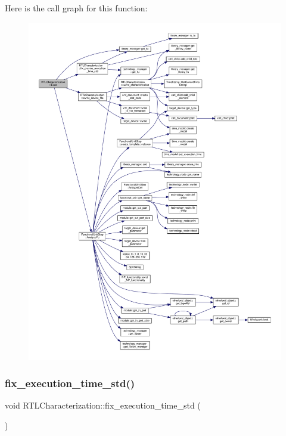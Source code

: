 Here is the call graph for this function\+:
\nopagebreak
\begin{figure}[H]
\begin{center}
\leavevmode
\includegraphics[width=350pt]{d9/d84/classRTLCharacterization_a6550aa6ae4bcf74abe7cb170f82d5905_cgraph}
\end{center}
\end{figure}
\mbox{\label{classRTLCharacterization_aac3182b7f98299ce58876579de647ad3}} 
\subsubsection{\texorpdfstring{fix\+\_\+execution\+\_\+time\+\_\+std()}{fix\_execution\_time\_std()}}
{\footnotesize\ttfamily void R\+T\+L\+Characterization\+::fix\+\_\+execution\+\_\+time\+\_\+std (\begin{DoxyParamCaption}{ }\end{DoxyParamCaption})\hspace{0.3cm}{\ttfamily [private]}}



